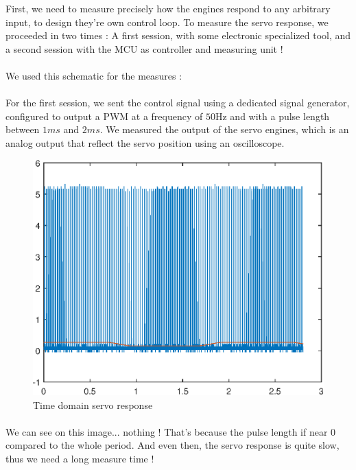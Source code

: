 First, we need to measure precisely how the engines respond to any arbitrary input, to design they're own control loop.
To measure the servo response, we proceeded in two times : A first session, with some electronic specialized tool, 
and a second session with the MCU as controller and measuring unit !

\paragraph{}
We used this schematic for the measures :


\paragraph{}
For the first session, we sent the control signal using a dedicated signal generator, configured 
to output a PWM at a frequency of $50 \si{\hertz}$ and with a pulse length between $1 \si{ms}$ and
$2 \si{ms}$.
We measured the output of the servo engines, which is an analog output that reflect the servo position
using an oscilloscope.

\begin{figure}[!hbt]
    \centering
    \includegraphics[width=\SchematicWidth]{images/Servos/time-domain-response.eps}
    \caption{Time domain servo response}
\end{figure}
\FloatBarrier

\paragraph{}
We can see on this image... nothing ! That's because the pulse length if near 0 compared to the whole
period. And even then, the servo response is quite slow, thus we need a long measure time !

